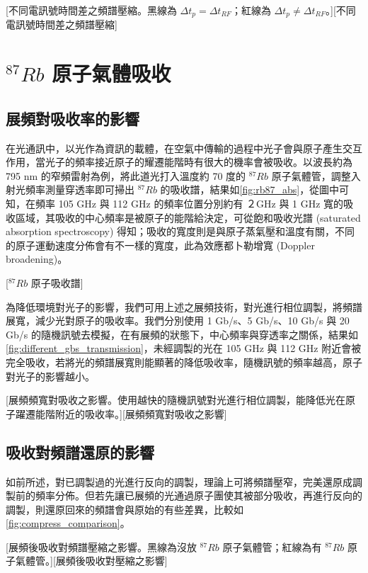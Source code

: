 \documentclass[class=NCU_thesis, crop=false]{standalone}
\begin{document}
[不同電訊號時間差之頻譜壓縮。黑線為 $\Delta t_{p}=\Delta t_{RF}$；紅線為 $\Delta t_{p} \neq \Delta t_{RF}$。][不同電訊號時間差之頻譜壓縮]

\section{$^{87}Rb$ 原子氣體吸收}

\subsection{展頻對吸收率的影響}
\label{section:simulation_absorption}
在光通訊中，以光作為資訊的載體，在空氣中傳輸的過程中光子會與原子產生交互作用，當光子的頻率接近原子的耀遷能階時有很大的機率會被吸收。以波長約為 795  nm 的窄頻雷射為例，將此道光打入溫度約 70 度的 $^{87}Rb$ 原子氣體管，調整入射光頻率測量穿透率即可掃出 $^{87}Rb$ 的吸收譜，結果如\cref{fig:rb87_abs}，從圖中可知，在頻率 105 GHz 與 112 GHz 的頻率位置分別約有 ２GHz 與 1 GHz 寬的吸收區域，其吸收的中心頻率是被原子的能階給決定，可從飽和吸收光譜 (saturated absorption spectroscopy) 得知；吸收的寬度則是與原子蒸氣壓和溫度有關，不同的原子運動速度分佈會有不一樣的寬度，此為效應都卜勒增寬 (Doppler broadening)。

[$^{87}Rb$ 原子吸收譜]

為降低環境對光子的影響，我們可用上述之展頻技術，對光進行相位調製，將頻譜展寬，減少光對原子的吸收率。我們分別使用 1 Gb/s、5 Gb/s、10 Gb/s 與 20 Gb/s 的隨機訊號去模擬，在有展頻的狀態下，中心頻率與穿透率之關係，結果如\cref{fig:different_gbs_transmission}，未經調製的光在 105 GHz 與 112 GHz 附近會被完全吸收，若將光的頻譜展寬則能顯著的降低吸收率，隨機訊號的頻率越高，原子對光子的影響越小。

[展頻頻寬對吸收之影響。使用越快的隨機訊號對光進行相位調製，能降低光在原子躍遷能階附近的吸收率。][展頻頻寬對吸收之影響]

\subsection{吸收對頻譜還原的影響}
如前所述，對已調製過的光進行反向的調製，理論上可將頻譜壓窄，完美還原成調製前的頻率分佈。但若先讓已展頻的光通過原子團使其被部分吸收，再進行反向的調製，則還原回來的頻譜會與原始的有些差異，比較如\cref{fig:compress_comparison}。

[展頻後吸收對頻譜壓縮之影響。黑線為沒放 $^{87}Rb$ 原子氣體管；紅線為有 $^{87}Rb$ 原子氣體管。][展頻後吸收對壓縮之影響]
\end{document}
